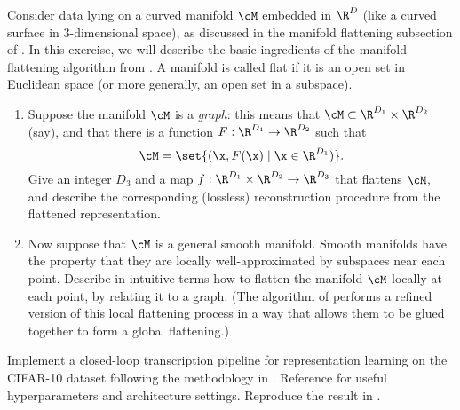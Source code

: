 \documentclass[../../book-main.tex]{subfiles}
\begin{document}
\begin{exercise}
  Consider data lying on a curved manifold $\cM$ embedded in $\R^D$ (like
  a curved surface in $3$-dimensional space), as discussed in the manifold
  flattening subsection of .
  In this exercise, we will describe the basic ingredients of the manifold
  flattening algorithm from \cite{Psenka-JMLR24}.
  A manifold is called flat if it is an open set in Euclidean space (or
  more generally, an open set in a subspace). 

  \begin{enumerate}
    \item Suppose the manifold $\cM$ is a \textit{graph}: this means that $\cM
      \subset \R^{D_1} \times \R^{D_2}$ (say), and that there is a function $F
      : \R^{D_1} \to \R^{D_2}$ such that
      \begin{equation}
        \cM = \set{(\x, F(\x) \mid \x \in \R^{D_1})}.
      \end{equation}
      Give an integer $D_3$ and a map $f : \R^{D_1} \times \R^{D_2} \to \R^{D_3}$
      that flattens $\cM$, and describe the corresponding (lossless)
      reconstruction procedure from the flattened representation.
    \item Now suppose that $\cM$ is a general smooth manifold. Smooth manifolds
      have the property that they are locally well-approximated by subspaces
      near each point. Describe in intuitive terms how to flatten the manifold
      $\cM$ locally at each point, by relating it to a graph. (The algorithm of
      \cite{Psenka-JMLR24} performs a refined version of this local flattening
      process in a way that allows them to be glued together to form a global
      flattening.)
  \end{enumerate}
\end{exercise}


\begin{exercise}

  Implement a closed-loop transcription pipeline for representation learning on
  the CIFAR-10 dataset following
  the methodology in .
  Reference \cite{Dai-entropy-2022} for useful hyperparameters and architecture
  settings. Reproduce the result in .


\end{exercise}
\end{document}
